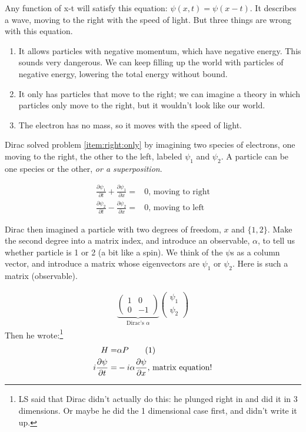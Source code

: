 \documentclass[]{article}
\newcommand\numberthis{\addtocounter{equation}{1}\tag{\theequation}}
\begin{document}
Any function of x-t will satisfy this  equation: $\psi(x,t)=\psi(x-t)$. It describes a wave, moving to the right with the speed of light. But three things are wrong with this equation.
\begin{enumerate}
	\item It allows particles with negative momentum, which have negative energy. This sounds very dangerous. We can keep filling up the world with particles of negative energy, lowering the total energy without bound.\label{item:negative:energy}
	\item It only has particles that move to the right; we can imagine a theory in which particles only move to the right, but it wouldn't look like our world. \label{item:right:only}
	\item The electron has no mass, so it moves with the speed of light.\label{item:speed:light}
\end{enumerate}

Dirac solved problem \ref{item:right:only} by imagining two species of electrons, one moving to the right, the other to the left, labeled $\psi_1$ and $\psi_2$. A particle can be one species or the other, \emph{or a superposition}.

\begin{align*}
	\frac{\partial \psi_1}{\partial t} + \frac{\partial \psi_1}{\partial x}=&0 \text{, moving to right}\\
	\frac{\partial \psi_2}{\partial t} - \frac{\partial \psi_2}{\partial x}=&0 \text{, moving to left}
\end{align*}

Dirac then imagined a particle with two degrees of freedom, $x$ and $\{1,2\}$. Make the second degree into a matrix index, and introduce an observable, $\alpha$, to tell us whether particle is 1 or 2 (a bit like a spin). We think of the $\psi$s as a column vector, and introduce a matrix whose eigenvectors are $\psi_1$ or $\psi_2$. Here is such a matrix (observable).

\begin{align*}
	\underbrace{
		\begin{pmatrix}
			1 & 0\\
			0 & -1
		\end{pmatrix}
	}_\text{Dirac's $\alpha$}
	\begin{pmatrix}
		\psi_1\\
		\psi_2
	\end{pmatrix}
\end{align*}
Then he wrote:\footnote{LS said that Dirac didn't actually do this: he plunged right in and did it in 3 dimensions. Or maybe he did the 1 dimensional case first, and didn't write it up.}
\begin{align*}
	H =& \alpha P \numberthis \label{eq:dirac:1d:hp}\\
	i\frac{\partial \psi}{\partial t} =& -i \alpha \frac{\partial \psi}{\partial x} \text{, matrix equation!}
\end{align*}
\end{document}
